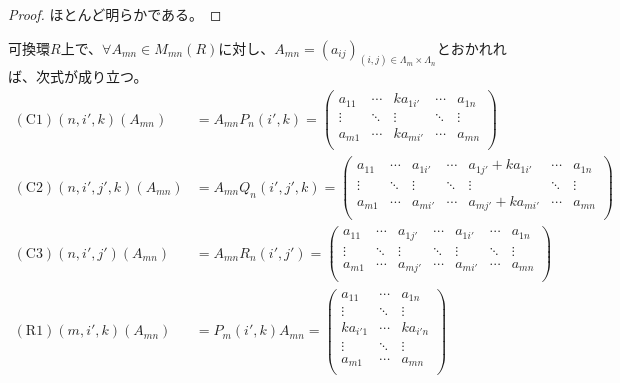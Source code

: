 \documentclass[dvipdfmx]{jsarticle}
\begin{document}
\begin{proof} ほとんど明らかである。
\end{proof}
\begin{thm}\label{2.1.7.3}
可換環$R$上で、$\forall A_{mn} \in M_{mn}(R)$に対し、$A_{mn} = \left( a_{ij} \right)_{(i,j) \in \varLambda_{m} \times \varLambda_{n}}$とおかれれば、次式が成り立つ。
\begin{align*}
(\mathrm{C1})\left( n,i',k \right)\left( A_{mn} \right) &= A_{mn}P_{n}\left( i',k \right) = \begin{pmatrix}
a_{11} & \cdots & ka_{1i'} & \cdots & a_{1n} \\
 \vdots & \ddots & \vdots & \ddots & \vdots \\
a_{m1} & \cdots & ka_{mi'} & \cdots & a_{mn} \\
\end{pmatrix}\\
(\mathrm{C2})\left( n,i',j',k \right)\left( A_{mn} \right) &= A_{mn}Q_{n}\left( i',j',k \right) = \begin{pmatrix}
a_{11} & \cdots & a_{1i'} & \cdots & a_{1j'} + ka_{1i'} & \cdots & a_{1n} \\
 \vdots & \ddots & \vdots & \ddots & \vdots & \ddots & \vdots \\
a_{m1} & \cdots & a_{mi'} & \cdots & a_{mj'} + ka_{mi'} & \cdots & a_{mn} \\
\end{pmatrix}\\
(\mathrm{C3})\left( n,i',j' \right)\left( A_{mn} \right) &= A_{mn}R_{n}\left( i',j' \right) = \begin{pmatrix}
a_{11} & \cdots & a_{1j'} & \cdots & a_{1i'} & \cdots & a_{1n} \\
 \vdots & \ddots & \vdots & \ddots & \vdots & \ddots & \vdots \\
a_{m1} & \cdots & a_{mj'} & \cdots & a_{mi'} & \cdots & a_{mn} \\
\end{pmatrix}\\
(\mathrm{R1})\left( m,i',k \right)\left( A_{mn} \right) &= P_{m}\left( i',k \right)A_{mn} = \begin{pmatrix}
a_{11} & \cdots & a_{1n} \\
 \vdots & \ddots & \vdots \\
ka_{i'1} & \cdots & ka_{i'n} \\
 \vdots & \ddots & \vdots \\
a_{m1} & \cdots & a_{mn} \\
\end{pmatrix}\\

\end{align*}
\end{thm}
\end{document}
